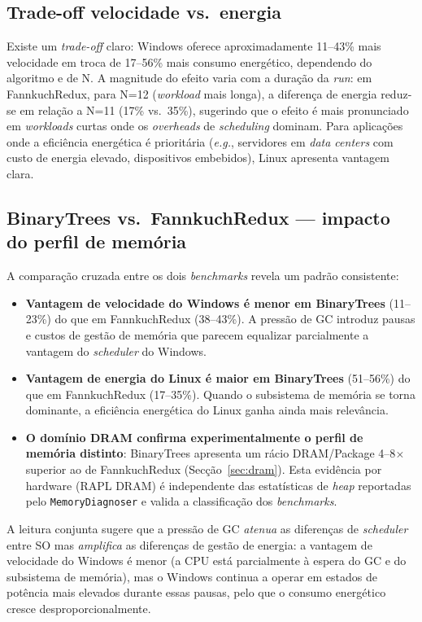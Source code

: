 \documentclass[12pt,a4paper]{article}
\begin{document}
\subsection{Trade-off velocidade vs.\ energia}

Existe um \textit{trade-off} claro: Windows oferece aproximadamente 11--43\%
mais velocidade em troca de 17--56\% mais consumo energético, dependendo do
algoritmo e de N.
A magnitude do efeito varia com a duração da \textit{run}: em FannkuchRedux,
para N=12 (\textit{workload} mais longa), a diferença de energia reduz-se em
relação a N=11 (17\% vs.\ 35\%), sugerindo que o efeito é mais pronunciado em
\textit{workloads} curtas onde os \textit{overheads} de \textit{scheduling}
dominam.
Para aplicações onde a eficiência energética é prioritária (\textit{e.g.},
servidores em \textit{data centers} com custo de energia elevado, dispositivos
embebidos), Linux apresenta vantagem clara.

\subsection{BinaryTrees vs.\ FannkuchRedux --- impacto do perfil de memória}
\label{sec:disc_perfil}

A comparação cruzada entre os dois \textit{benchmarks} revela um padrão
consistente:

\begin{itemize}
  \item \textbf{Vantagem de velocidade do Windows é menor em BinaryTrees}
    (11--23\%) do que em FannkuchRedux (38--43\%).
    A pressão de GC introduz pausas e custos de gestão de memória que parecem
    equalizar parcialmente a vantagem do \textit{scheduler} do Windows.
  \item \textbf{Vantagem de energia do Linux é maior em BinaryTrees}
    (51--56\%) do que em FannkuchRedux (17--35\%).
    Quando o subsistema de memória se torna dominante, a eficiência energética
    do Linux ganha ainda mais relevância.
  \item \textbf{O domínio DRAM confirma experimentalmente o perfil de memória
    distinto}: BinaryTrees apresenta um rácio DRAM/Package 4--8$\times$
    superior ao de FannkuchRedux (Secção~\ref{sec:dram}).
    Esta evidência por hardware (RAPL DRAM) é independente das estatísticas de
    \textit{heap} reportadas pelo \texttt{MemoryDiagnoser} e valida a
    classificação dos \textit{benchmarks}.
\end{itemize}

A leitura conjunta sugere que a pressão de GC \textit{atenua} as diferenças de
\textit{scheduler} entre SO mas \textit{amplifica} as diferenças de gestão de
energia: a vantagem de velocidade do Windows é menor (a CPU está parcialmente
à espera do GC e do subsistema de memória), mas o Windows continua a operar
em estados de potência mais elevados durante essas pausas, pelo que o consumo
energético cresce desproporcionalmente.
\end{document}
